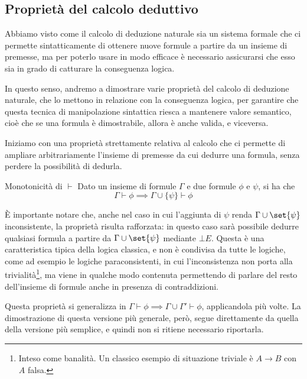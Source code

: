 \subsection{Proprietà del calcolo deduttivo}

Abbiamo visto come il calcolo di deduzione naturale sia un sistema formale che ci permette sintatticamente di ottenere nuove formule a partire da un insieme di premesse, ma per poterlo usare in modo efficace è necessario assicurarsi che esso sia in grado di catturare la conseguenza logica.

In questo senso, andremo a dimostrare varie proprietà del calcolo di deduzione naturale, che lo mettono in relazione con la conseguenza logica, per garantire che questa tecnica di manipolazione sintattica riesca a mantenere valore semantico, cioè che se una formula è dimostrabile, allora è anche valida, e viceversa.

Iniziamo con una proprietà strettamente relativa al calcolo che ci permette di ampliare arbitrariamente l'insieme di premesse da cui dedurre una formula, senza perdere la possibilità di dedurla.

\begin{theorem}[namedlabel={thm:monotonicity}{Monotonicità}]{Monotonicità di \(\vdash\)}
  Dato un insieme di formule \(\Gamma\) e due formule \(\phi\) e \(\psi\), si ha che
  \[\Gamma \vdash \phi \implies \Gamma \cup \{\psi\} \vdash \phi\]
\end{theorem}

È importante notare che, anche nel caso in cui l'aggiunta di \(\psi\) renda \(\Gamma \cup \set{\psi}\) inconsistente, la proprietà risulta rafforzata: in questo caso sarà possibile dedurre qualsiasi formula a partire da \(\Gamma \cup \set{\psi}\) mediante \(\bot E\). Questa è una caratteristica tipica della logica classica, e non è condivisa da tutte le logiche, come ad esempio le logiche paraconsistenti, in cui l'inconsistenza non porta alla trivialità\footnote{Inteso come banalità. Un classico esempio di situazione triviale è \(A \to B\) con \(A\) falsa.}, ma viene in qualche modo contenuta permettendo di parlare del resto dell'insieme di formule anche in presenza di contraddizioni.

\begin{note}{}
  Questa proprietà si generalizza in \(\Gamma \vdash \phi \implies \Gamma \cup \Gamma' \vdash \phi\), applicandola più volte. La dimostrazione di questa versione più generale, però, segue direttamente da quella della versione più semplice, e quindi non si ritiene necessario riportarla.
\end{note}


